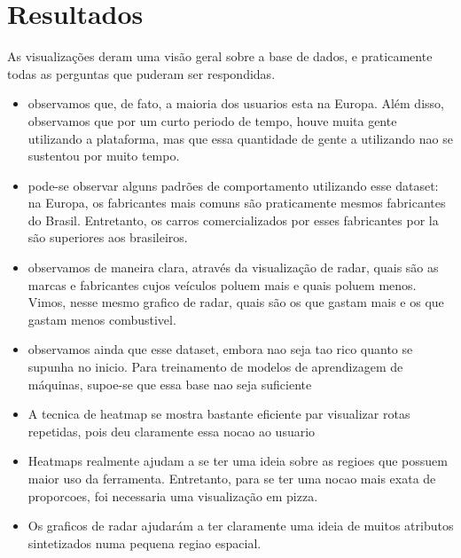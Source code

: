 \documentclass[10pt, conference]{IEEEtran}
\begin{document}



\section{Resultados}
%

As visualizações deram uma visão geral sobre a base de dados, e praticamente todas
as perguntas que puderam ser respondidas. 

\begin{itemize}
  
  \item observamos que, de fato, a maioria dos usuarios esta na Europa. Além disso, observamos
    que por um curto periodo de tempo, houve muita gente utilizando a plataforma, mas que essa
    quantidade de gente a utilizando nao se sustentou por muito tempo.

  \item pode-se observar alguns padrões de comportamento utilizando esse dataset: na Europa, os
    fabricantes mais comuns são praticamente mesmos fabricantes do Brasil. Entretanto, os carros
    comercializados por esses fabricantes por la são superiores aos brasileiros.

  \item observamos de maneira clara, através da visualização de radar, quais são as marcas
  e fabricantes cujos veículos poluem mais e quais poluem menos. Vimos, nesse mesmo grafico de radar,  
  quais são os que gastam mais e os que gastam menos combustivel.

  \item observamos ainda que esse dataset, embora nao seja tao rico quanto se supunha no inicio. Para
  treinamento de modelos de aprendizagem de máquinas, supoe-se que essa base nao seja suficiente

  \item A tecnica de heatmap se mostra bastante eficiente par visualizar rotas repetidas, pois deu
  claramente essa nocao ao usuario

  \item Heatmaps realmente ajudam a se ter uma ideia sobre as regioes que possuem maior uso da ferramenta.
  Entretanto, para se ter uma nocao mais exata de proporcoes, foi necessaria uma visualização em pizza.

  \item Os graficos de radar ajudarám a ter claramente uma ideia de muitos atributos sintetizados numa
  pequena regiao espacial.

\end{itemize}
\end{document}
